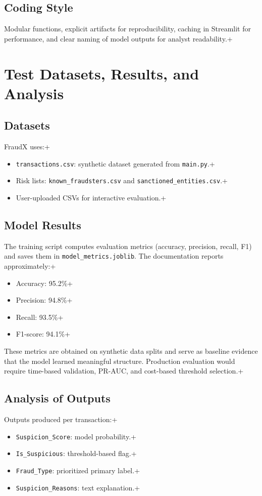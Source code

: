\documentclass[12pt,a4paper]{report}
\begin{document}
\section{Coding Style}
Modular functions, explicit artifacts for reproducibility, caching in Streamlit for performance, and clear naming of model outputs for analyst readability.\n+
\chapter{Test Datasets, Results, and Analysis}
\section{Datasets}
FraudX uses:\n+\begin{itemize}
  \item \texttt{transactions.csv}: synthetic dataset generated from \texttt{main.py}.\n+  \item Risk lists: \texttt{known\_fraudsters.csv} and \texttt{sanctioned\_entities.csv}.\n+  \item User-uploaded CSVs for interactive evaluation.\n+\end{itemize}

\section{Model Results}
The training script computes evaluation metrics (accuracy, precision, recall, F1) and saves them in \texttt{model\_metrics.joblib}. The documentation reports approximately:\n+\begin{itemize}
  \item Accuracy: 95.2\%\n+  \item Precision: 94.8\%\n+  \item Recall: 93.5\%\n+  \item F1-score: 94.1\%\n+\end{itemize}
These metrics are obtained on synthetic data splits and serve as baseline evidence that the model learned meaningful structure. Production evaluation would require time-based validation, PR-AUC, and cost-based threshold selection.\n+
\section{Analysis of Outputs}
Outputs produced per transaction:\n+\begin{itemize}
  \item \texttt{Suspicion\_Score}: model probability.\n+  \item \texttt{Is\_Suspicious}: threshold-based flag.\n+  \item \texttt{Fraud\_Type}: prioritized primary label.\n+  \item \texttt{Suspicion\_Reasons}: text explanation.\n+\end{itemize}
\end{document}
